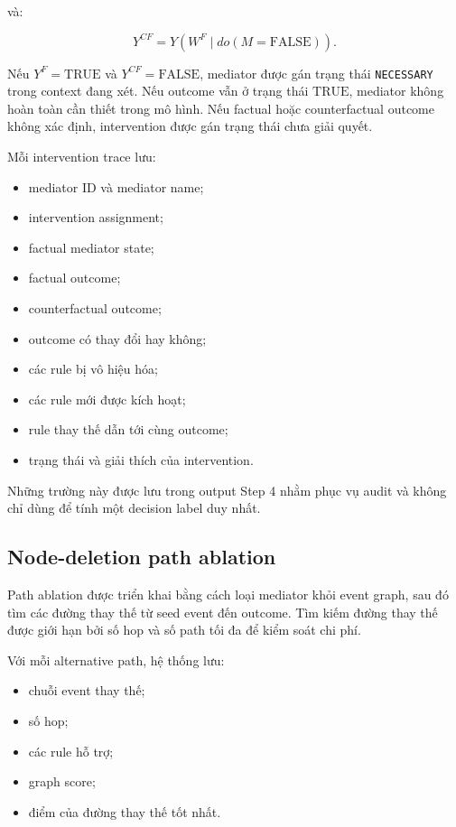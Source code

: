 và:

\[
Y^{CF}
=
Y
\left(
W^{F}
\mid
do(M=\mathrm{FALSE})
\right).
\]

Nếu \(Y^{F}=\mathrm{TRUE}\) và \(Y^{CF}=\mathrm{FALSE}\), mediator được gán
trạng thái \texttt{NECESSARY} trong context đang xét. Nếu outcome vẫn ở
trạng thái \(\mathrm{TRUE}\), mediator không hoàn toàn cần thiết trong mô
hình. Nếu factual hoặc counterfactual outcome không xác định, intervention
được gán trạng thái chưa giải quyết.

Mỗi intervention trace lưu:

\begin{itemize}
    \item mediator ID và mediator name;
    \item intervention assignment;
    \item factual mediator state;
    \item factual outcome;
    \item counterfactual outcome;
    \item outcome có thay đổi hay không;
    \item các rule bị vô hiệu hóa;
    \item các rule mới được kích hoạt;
    \item rule thay thế dẫn tới cùng outcome;
    \item trạng thái và giải thích của intervention.
\end{itemize}

Những trường này được lưu trong output Step 4 nhằm phục vụ audit và không chỉ
dùng để tính một decision label duy nhất.

\subsection{Node-deletion path ablation}

Path ablation được triển khai bằng cách loại mediator khỏi event graph, sau
đó tìm các đường thay thế từ seed event đến outcome. Tìm kiếm đường thay thế
được giới hạn bởi số hop và số path tối đa để kiểm soát chi phí.

Với mỗi alternative path, hệ thống lưu:

\begin{itemize}
    \item chuỗi event thay thế;
    \item số hop;
    \item các rule hỗ trợ;
    \item graph score;
    \item điểm của đường thay thế tốt nhất.
\end{itemize}

